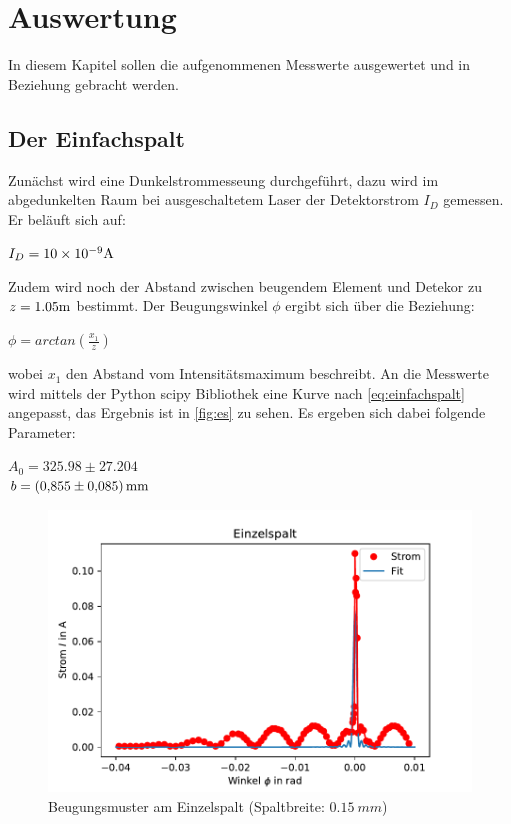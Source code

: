\section{Auswertung}
\label{sec:auswertung}
In diesem Kapitel sollen die aufgenommenen Messwerte ausgewertet und in Beziehung gebracht werden.

\subsection{Der Einfachspalt}
\label{sec:einfachspalt}
Zunächst wird eine Dunkelstrommesseung durchgeführt, dazu wird im abgedunkelten Raum bei ausgeschaltetem
Laser der Detektorstrom $I_D$ gemessen. Er beläuft sich auf:
\begin{center}
    $I_D=10\times 10^{-9}\si[]{A}$
\end{center}
Zudem wird noch der Abstand zwischen beugendem Element und Detekor zu $z=1.05\si[]{m}$ bestimmt.
Der Beugungswinkel $\phi$ ergibt sich über die Beziehung:
\begin{center}
    $\phi=arctan(\frac{x_1}{z})$
\end{center}
wobei $x_1$ den Abstand vom Intensitätsmaximum beschreibt.
An die Messwerte wird mittels der Python scipy Bibliothek eine Kurve nach \autoref{eq:einfachspalt} 
angepasst, das Ergebnis ist in \autoref{fig:es} zu sehen. Es ergeben sich dabei folgende Parameter:
\begin{center}
    $A_0=325.98\pm 27.204$\\
    $b=\SI[]{0.855\pm 0.085}[]{mm}$
\end{center}
\begin{figure}
    \centering
    \includegraphics{Einzelspalt.pdf}
    \caption{Beugungsmuster am Einzelspalt (Spaltbreite: $\SI[]{0.15}[]{mm}$)}
    \label{fig:es}
  \end{figure}

